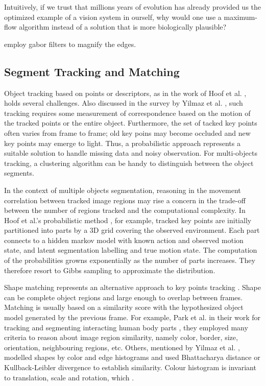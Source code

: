 \documentclass{article}
\begin{document}
Intuitively, if we trust that millions years of evolution has already provided us the optimized example of a vision system in ourself, why would one use a maximum-flow algorithm instead of a solution that is more biologically plausible?

employ gabor filters \cite{gabor} to magnify the edges. 


\subsection{Segment Tracking and Matching}

Object tracking based on points or descriptors, as in the work of Hoof et al. \cite{Herke}, holds several challenges. Also discussed in the survey by Yilmaz et al. \cite{tracking}, such tracking requires some measurement of correspondence based on the motion of the tracked points or the entire object. Furthermore, the set of tacked key points often varies from frame to frame; old key poins may become occluded and new key points may emerge to light. Thus, a probabilistic approach represents a suitable solution to handle missing data and noisy observation. For multi-objects tracking, a clustering algorithm can be handy to distinguish between the object segments. 

In the context of multiple objects segmentation, reasoning in the movement correlation between tracked image regions may rise a concern in the trade-off between the number of regions tracked and the computational complexity. In Hoof et al.'s probabilistic method \cite{herke}, for example, tracked key points are initially partitioned into parts by a 3D grid covering the observed environment. Each part connects to a hidden markov model with known action and observed motion state, and latent segmentation labelling and true motion state. The computation of the probabilities growns exponentially as the number of parts increases. They therefore resort to Gibbs sampling to approximate the distribution. 

Shape matching represents an alternative approach to key points tracking \cite{tracking}. Shape can be complete object regions and large enough to overlap between frames. Matching is usually based on a similarity score with the hypothesized object model generated by the previous frame. For example, Park et al. in their work for tracking and segmenting interacting human body parts \cite{human-action}, they employed many criteria to reason about image region similarity, namely color, border, size, orientation, neighbouring regions, etc. Others, mentioned by Yilmaz et al. \cite{tracking}, modelled shapes by color and edge histograms and used Bhattacharya distance or Kullback-Leibler divergence to establish similarity. Colour histogram is invariant to translation, scale and rotation, which . 
\end{document}
